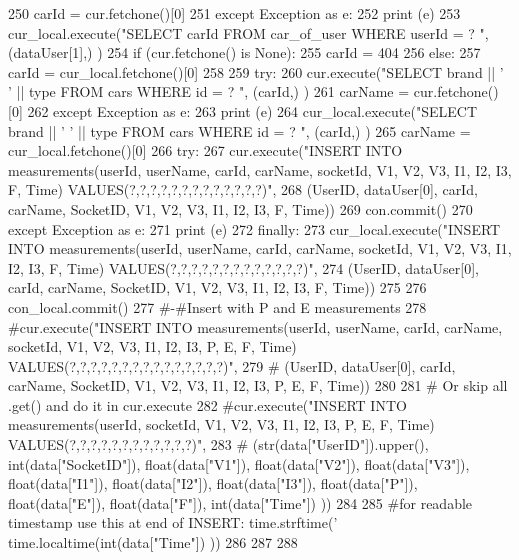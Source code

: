 \begin{DoxyCode}
250             carId = cur.fetchone()[0]        
251     \textcolor{keywordflow}{except} Exception \textcolor{keyword}{as} e:
252         \textcolor{keywordflow}{print} (e)
253         cur\_local.execute(\textcolor{stringliteral}{"SELECT carId FROM car\_of\_user WHERE userId = ? "}, (dataUser[1],) )
254         \textcolor{keywordflow}{if} (cur.fetchone() \textcolor{keywordflow}{is} \textcolor{keywordtype}{None}):
255             carId = 404
256         \textcolor{keywordflow}{else}:
257             carId = cur\_local.fetchone()[0]
258     
259     \textcolor{keywordflow}{try}:
260         cur.execute(\textcolor{stringliteral}{"SELECT brand || ' ' || type FROM cars WHERE id = ? "}, (carId,) )
261         carName = cur.fetchone()[0]
262     \textcolor{keywordflow}{except} Exception \textcolor{keyword}{as} e:
263         \textcolor{keywordflow}{print} (e)
264         cur\_local.execute(\textcolor{stringliteral}{"SELECT brand || ' ' || type FROM cars WHERE id = ? "}, (carId,) )
265         carName = cur\_local.fetchone()[0]
266     \textcolor{keywordflow}{try}:    
267         cur.execute(\textcolor{stringliteral}{"INSERT INTO measurements(userId, userName, carId, carName, socketId, V1, V2, V3, I1,
       I2, I3, F, Time) VALUES(?,?,?,?,?,?,?,?,?,?,?,?,?)"},
268                     (UserID, dataUser[0], carId, carName, SocketID, V1, V2, V3, I1, I2, I3, F, Time))
269         con.commit()
270     \textcolor{keywordflow}{except} Exception \textcolor{keyword}{as} e:
271         \textcolor{keywordflow}{print} (e)
272     \textcolor{keywordflow}{finally}:
273         cur\_local.execute(\textcolor{stringliteral}{"INSERT INTO measurements(userId, userName, carId, carName, socketId, V1, V2, V3,
       I1, I2, I3, F, Time) VALUES(?,?,?,?,?,?,?,?,?,?,?,?,?)"},
274                 (UserID, dataUser[0], carId, carName, SocketID, V1, V2, V3, I1, I2, I3, F, Time))
275     
276     con\_local.commit()
277     \textcolor{comment}{#-#Insert with P and E measurements}
278     \textcolor{comment}{#cur.execute("INSERT INTO measurements(userId, userName, carId, carName, socketId, V1, V2, V3, I1, I2,
       I3, P, E, F, Time) VALUES(?,?,?,?,?,?,?,?,?,?,?,?,?,?,?)",}
279     \textcolor{comment}{#            (UserID, dataUser[0], carId, carName, SocketID, V1, V2, V3, I1, I2, I3, P, E, F, Time))}
280     
281     \textcolor{comment}{# Or skip all .get() and do it in cur.execute     }
282     \textcolor{comment}{#cur.execute("INSERT INTO measurements(userId, socketId, V1, V2, V3, I1, I2, I3, P, E, F, Time)
       VALUES(?,?,?,?,?,?,?,?,?,?,?,?)",}
283     \textcolor{comment}{#            (str(data["UserID"]).upper(), int(data["SocketID"]), float(data["V1"]), float(data["V2"]),
       float(data["V3"]), float(data["I1"]), float(data["I2"]), float(data["I3"]), float(data["P"]),
       float(data["E"]), float(data["F"]), int(data["Time"]) ))}
284     
285    \textcolor{comment}{#for readable timestamp use this at end of INSERT: time.strftime('%
       time.localtime(int(data["Time"]) ))}
286     
287     
288 
\end{DoxyCode}

